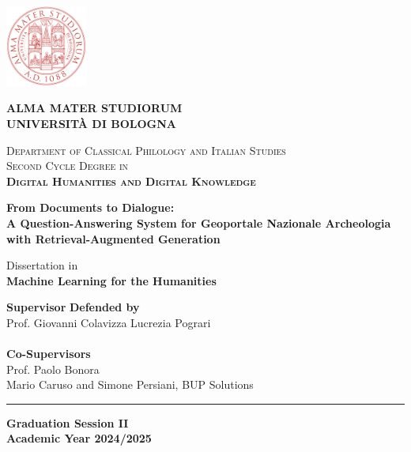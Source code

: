 \documentclass[a4paper,12pt, openany]{book}  %
\begin{document}
\begin{titlepage}
    \centering
    \includegraphics[width=0.2\textwidth]{images/unibo-logo.pdf}
    
    \vspace*{1cm}
    \Large
    \textbf{ALMA MATER STUDIORUM \\ 
    UNIVERSITÀ DI BOLOGNA}
    
    
    \vspace{1.5cm}
    
    \normalsize
    \textsc{Department of Classical Philology and Italian Studies} \\
    \vspace{0.5cm}
    \textsc{Second Cycle Degree in} \\
    \vspace{0.2cm}
    \textsc{\textbf{Digital Humanities and Digital Knowledge}}
    
    \vspace{1.6cm}
    
    \begin{spacing}{1}
    \LARGE
    \textbf{From Documents to Dialogue:\\A Question-Answering System for Geoportale Nazionale Archeologia with Retrieval-Augmented Generation}
    \end{spacing}
    
    \vspace{1.2cm}
    \normalsize
    Dissertation in\\
    \textbf{Machine Learning for the Humanities}
    
    \vspace{1cm}
    
    \begin{tabbing}
    \textbf{Supervisor} \hspace{10cm} \= \textbf{Defended by} \\
    Prof. Giovanni Colavizza \> Lucrezia Pograri \\
    \\
    \textbf{Co-Supervisors}\\
    Prof. Paolo Bonora \\
    Mario Caruso and Simone Persiani, BUP Solutions
    \end{tabbing}
    
    \vfill
    \rule{\linewidth}{0.4pt}
    \vspace{0.2cm}
    
    \textbf{Graduation Session II} \\
    \textbf{Academic Year 2024/2025}
    
\end{titlepage}
\newpage
\thispagestyle{empty}  %
\mbox{}                %
\setcounter{figure}{0}
\end{document}
